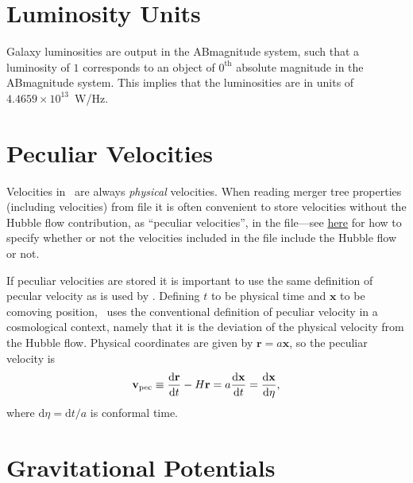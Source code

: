 \section{Luminosity Units}

Galaxy luminosities are output in the \gls{ABmagnitude} system, such that a luminosity of $1$ corresponds to an object of $0^\mathrm{th}$ absolute magnitude in the \gls{ABmagnitude} system. This implies that the luminosities are in units of $4.4659\times 10^{13}$~W/Hz.

\section{Peculiar Velocities}\label{sec:GalacticusVelocityDefinitions}

Velocities in \glc\ are always \emph{physical} velocities. When reading merger tree properties (including velocities) from file it is often convenient to store velocities without the Hubble flow contribution, as ``peculiar velocities'', in the file---see \href{https://github.com/galacticusorg/galacticus/wiki/Merger-Tree-File-Format#forest-halos-group}{here} for how to specify whether or not  the velocities included in the file include the Hubble flow or not.

If peculiar velocities are stored it is important to use the same definition of pecular velocity as is used by \glc. Defining $t$ to be physical time and $\mathbf{x}$ to be comoving position, \glc\ uses the conventional definition of peculiar velocity in a cosmological context, namely that it is the deviation of the physical velocity from the Hubble flow. Physical coordinates are given by $\mathbf{r} = a\mathbf{x}$, so the peculiar velocity is
\begin{equation}
\mathbf{v}_\mathrm{pec} \equiv {\mathrm{d} \mathbf{r} \over \mathrm{d} t} - H \mathbf{r} = a {\mathrm{d} \mathbf{x}\over\mathrm{d} t} = {\mathrm{d}\mathbf{x}\over\mathrm{d}\eta},
\end{equation}
where $\mathrm{d}\eta = \mathrm{d}t/a$ is conformal time. 

\section{Gravitational Potentials}

